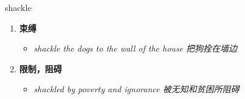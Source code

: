 
\begin{frame}
{\huge shackle}
\begin{center}
\begin{enumerate}\Large
  \item \textbf{束缚}
  \begin{itemize}
    \item \em{\Large{shackle the dogs to the wall of the house 把狗拴在墙边}}
  \end{itemize}
  \item \textbf{限制，阻碍}
  \begin{itemize}
    \item \em{\Large{shackled by poverty and ignorance 被无知和贫困所阻碍}}
  \end{itemize}
\end{enumerate}
\end{center}
\end{frame}
